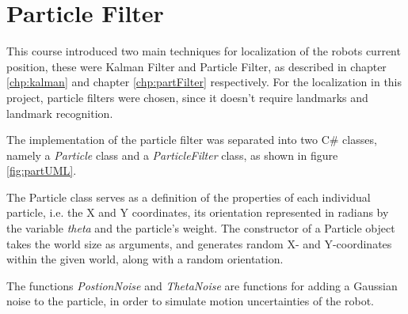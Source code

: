 
\section{Particle Filter}
\label{sec:particleFilter}

This course introduced two main techniques for localization of the robots current position, these were Kalman Filter and Particle Filter, as described in chapter \ref{chp:kalman} and chapter \ref{chp:partFilter} respectively.
For the localization in this project, particle filters were chosen, since it doesn't require landmarks and landmark recognition.

The implementation of the particle filter was separated into two C\# classes, namely a \emph{Particle} class and a \emph{ParticleFilter} class, as shown in figure \ref{fig:partUML}.

The Particle class serves as a definition of the properties of each individual particle, i.e. the X and Y coordinates, its orientation represented in radians by the variable \emph{theta} and the particle's weight.
The constructor of a Particle object takes the world size as arguments, and generates random X- and Y-coordinates within the given world, along with a random orientation.

The functions \emph{PostionNoise} and \emph{ThetaNoise} are functions for adding a Gaussian noise to the particle, in order to simulate motion uncertainties of the robot.


